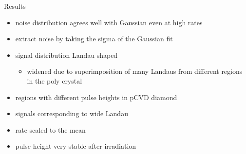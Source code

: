 \begin{block}{Results}
	
	
	\begin{itemize}
		\item noise distribution agrees well with Gaussian even at high rates
		\item extract noise by taking the sigma of the Gaussian fit
		\item signal distribution Landau shaped
		\begin{itemize}
			\item widened due to superimposition of many Landaus from different regions in the poly crystal
		\end{itemize}
	\end{itemize}
	
	
	\begin{itemize}
		\item regions with different pulse heights in pCVD diamond
		\item signals corresponding to wide Landau
		\item rate scaled to the mean
		\item pulse height very stable after irradiation
	\end{itemize}
	
\end{block}

